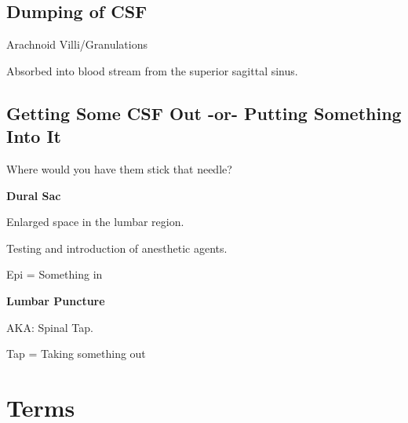 \subsection{Dumping of CSF}

\begin{coloredlist}
    \item Arachnoid Villi/Granulations
    \begin{coloredlist}
        \item Absorbed into blood stream from the superior sagittal sinus.
    \end{coloredlist}
\end{coloredlist}

\subsection{Getting Some CSF Out -or- Putting Something Into It}

\begin{coloredlist}
    \item Where would you have them stick that needle?
    \begin{coloredlist}
        \item \textbf{Dural Sac}
        \begin{coloredlist}
            \item Enlarged space in the lumbar region.
            \item Testing and introduction of anesthetic agents.
            \item Epi = Something in
        \end{coloredlist}
        \item \textbf{Lumbar Puncture}
        \begin{coloredlist}
            \item AKA: Spinal Tap.
            \item Tap = Taking something out
        \end{coloredlist}
    \end{coloredlist}
\end{coloredlist}

\section{Terms}

